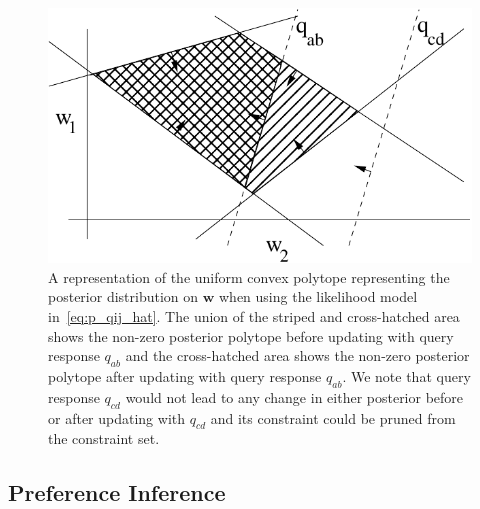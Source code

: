 \documentclass{article} %
\renewcommand{\vec}[1]{\mathbf{#1}}
\begin{document}
\begin{figure}[t!]
\begin{center}
\vspace{-1mm}
\includegraphics[width=.6\textwidth]{polytope}
\end{center}
\vspace{-4mm}
\caption{\footnotesize A representation of the uniform convex polytope
representing the posterior distribution on $\vec{w}$ when using the
likelihood model in~\eqref{eq:p_qij_hat}.  The union of the 
striped and cross-hatched area shows 
the non-zero posterior polytope before updating with query response
$q_{ab}$ and the cross-hatched area shows the non-zero posterior
polytope after updating with query response $q_{ab}$.  We note that
query response $q_{cd}$ would not lead to any change in either 
posterior before or after updating with $q_{cd}$ and its constraint
could be pruned from the constraint set.} \label{fig:polytope}
\end{figure}

\subsection{Preference Inference}

\label{sec:bppl_inference}

\end{document}
